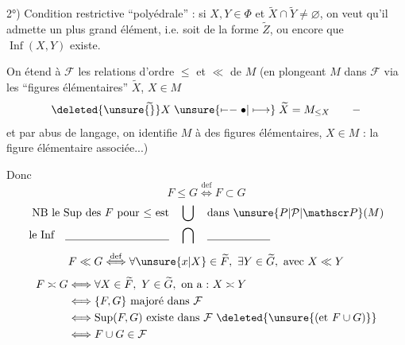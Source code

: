 
2°) Condition restrictive ``polyédrale'' : si $X,Y\in\Phi$ et $\widetilde X\cap\widetilde Y\ne\varnothing$, on veut qu'il  admette un plus grand élément, i.e. soit de la forme $\widetilde Z$, ou encore que $\operatorname{Inf}(X,Y)$ existe.

On étend à $\mathcal F$ les relations d'ordre $\leq$ et $\ll$ de $M$ (en plongeant $M$ dans $\mathcal F$ via les ``figures élémentaires'' $\widetilde X$, $X\in M$
\[
\deleted{\unsure{\widetilde{\vphantom X}}}X\mathrel{\unsure{\mapstochar\relbar\relbar\bullet|\longmapsto}}\widetilde X=M_{\leq X}\qquad-
\]
 et par abus de langage, on identifie $M$ à  des figures élémentaires, $X\in M$ : la figure élémentaire associée...)


Donc
\[
F\leq G\overset{\mathrm{def}}{\Longleftrightarrow}F\subset G
\]
\[
\begin{aligned}
\text{NB le Sup des $F$ pour $\leq$ est}\quad&\bigcup\quad\text{dans $\unsure{P|\mathcal P|\mathscr P}(M)$}\\
\text{le Inf}\quad\underline{\hspace{3.3cm}}\quad&\bigcap\quad\underline{\hspace{2cm}}
\end{aligned}
\]
\[
F\ll G\overset{\mathrm{def}}{\Longleftrightarrow}\forall\unsure{x|X}\in\widetilde F,\ \exists Y\in\widetilde G,\ \text{avec}\ X\ll Y
\]
\[
\begin{aligned}
F\asymp G&\Longleftrightarrow\forall X\in\widetilde F,\ Y\in\widetilde G,\ \text{on a :}\ X\asymp Y\\
&\Longleftrightarrow\{F,G\}\ \text{majoré dans}\ \mathcal F\\
&\Longleftrightarrow\operatorname{Sup}(F,G)\ \text{existe dans}\ \mathcal F\ \deleted{\unsure{\text{(et }F\cup G\text{)}}}\\
&\Longleftrightarrow F\cup G\in\mathcal F
\end{aligned}
\]
